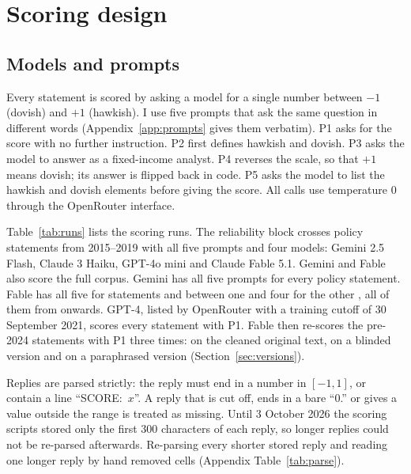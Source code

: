 \section{Scoring design}\label{sec:design}

\subsection{Models and prompts}

Every statement is scored by asking a model for a single number between $-1$ (dovish) and $+1$
(hawkish). I use five prompts that ask the same question in different words (Appendix~\ref{app:prompts}
gives them verbatim). P1 asks for the score with no further instruction. P2 first defines hawkish and
dovish. P3 asks the model to answer as a fixed-income analyst. P4 reverses the scale, so that $+1$ means
dovish; its answer is flipped back in code. P5 asks the model to list the hawkish and dovish elements
before giving the score. All calls use temperature 0 through the OpenRouter interface.

Table~\ref{tab:runs} lists the scoring runs. The reliability block crosses  policy
statements from 2015--2019 with all five prompts and four models: Gemini 2.5 Flash, Claude 3 Haiku,
GPT-4o mini and Claude Fable 5.1. Gemini and Fable also score the full corpus. Gemini has all five
prompts for every policy statement. Fable has all five for  statements and between
one and four for the other , all of them from  onwards. GPT-4, listed by OpenRouter
with a training cutoff of 30 September 2021, scores every statement with P1. Fable then re-scores the
pre-2024 statements with P1 three times: on the cleaned original text, on a blinded version and on a
paraphrased version (Section~\ref{sec:versions}).

Replies are parsed strictly: the reply must end in a number in $[-1,1]$, or contain a line
``SCORE:~$x$''. A reply that is cut off, ends in a bare ``0.'' or gives a value outside the range is
treated as missing. Until 3 October 2026 the scoring scripts stored only the first 300 characters of each
reply, so longer replies could not be re-parsed afterwards. Re-parsing every shorter stored reply and
reading one longer reply by hand removed  cells (Appendix Table~\ref{tab:parse}).

